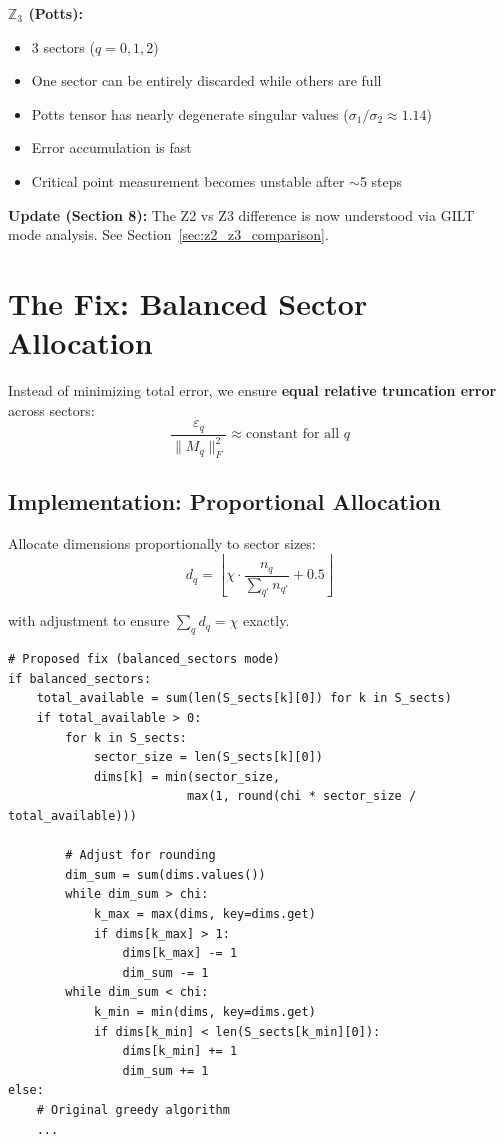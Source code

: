 \documentclass{article}
\begin{document}
\textbf{$\mathbb{Z}_3$ (Potts):}
\begin{itemize}
    \item 3 sectors ($q=0,1,2$)
    \item One sector can be entirely discarded while others are full
    \item Potts tensor has nearly degenerate singular values ($\sigma_1/\sigma_2 \approx 1.14$)
    \item Error accumulation is fast
    \item Critical point measurement becomes unstable after $\sim$5 steps
\end{itemize}

\textbf{Update (Section 8):} The Z2 vs Z3 difference is now understood via GILT mode analysis. See Section~\ref{sec:z2_z3_comparison}.

\section{The Fix: Balanced Sector Allocation}

Instead of minimizing total error, we ensure \textbf{equal relative truncation error} across sectors:
\begin{equation}
    \frac{\varepsilon_q}{\|M_q\|_F^2} \approx \text{constant for all } q
\end{equation}

\subsection{Implementation: Proportional Allocation}

Allocate dimensions proportionally to sector sizes:
\begin{equation}
    d_q = \left\lfloor \chi \cdot \frac{n_q}{\sum_{q'} n_{q'}} + 0.5 \right\rfloor
\end{equation}

with adjustment to ensure $\sum_q d_q = \chi$ exactly.

\begin{lstlisting}
# Proposed fix (balanced_sectors mode)
if balanced_sectors:
    total_available = sum(len(S_sects[k][0]) for k in S_sects)
    if total_available > 0:
        for k in S_sects:
            sector_size = len(S_sects[k][0])
            dims[k] = min(sector_size,
                         max(1, round(chi * sector_size / total_available)))

        # Adjust for rounding
        dim_sum = sum(dims.values())
        while dim_sum > chi:
            k_max = max(dims, key=dims.get)
            if dims[k_max] > 1:
                dims[k_max] -= 1
                dim_sum -= 1
        while dim_sum < chi:
            k_min = min(dims, key=dims.get)
            if dims[k_min] < len(S_sects[k_min][0]):
                dims[k_min] += 1
                dim_sum += 1
else:
    # Original greedy algorithm
    ...
\end{lstlisting}
\end{document}
